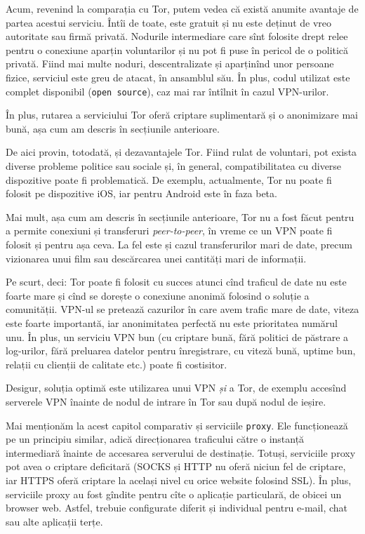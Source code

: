 Acum, revenind la comparația cu Tor, putem vedea că există anumite avantaje
de partea acestui serviciu. Întîi de toate, este gratuit și nu este deținut
de vreo autoritate sau firmă privată. Nodurile intermediare care sînt folosite
drept relee pentru o conexiune aparțin voluntarilor și nu pot fi puse în pericol
de o politică privată. Fiind mai multe noduri, descentralizate și aparținînd unor
persoane fizice, serviciul este greu de atacat, în ansamblul său.
În plus, codul utilizat este complet disponibil
(\texttt{open source}), caz mai rar întîlnit în cazul VPN-urilor.

În plus, rutarea  a serviciului Tor oferă criptare suplimentară
și o anonimizare mai bună, așa cum am descris în secțiunile anterioare.

De aici provin, totodată, și dezavantajele Tor. Fiind rulat de voluntari, pot exista
diverse probleme politice sau sociale și, în general, compatibilitatea cu diverse
dispozitive poate fi problematică. De exemplu, actualmente, Tor nu poate fi folosit
pe dispozitive iOS, iar pentru Android este în faza beta.

Mai mult, așa cum am descris în secțiunile anterioare, Tor nu a fost făcut pentru
a permite conexiuni și transferuri \textit{peer-to-peer}, în vreme ce un VPN poate
fi folosit și pentru așa ceva. La fel este și cazul transferurilor mari de date,
precum vizionarea unui film sau descărcarea unei cantități mari de informații.

\vspace{1cm}

Pe scurt, deci: Tor poate fi folosit cu succes atunci cînd traficul de date nu
este foarte mare și cînd se dorește o conexiune anonimă folosind o soluție a
comunității. VPN-ul se pretează cazurilor în care avem trafic mare de date,
viteza este foarte importantă, iar anonimitatea perfectă nu este prioritatea
numărul unu. În plus, un serviciu VPN bun (cu criptare bună, fără politici de
păstrare a log-urilor, fără preluarea datelor pentru înregistrare, cu viteză bună,
uptime bun, relații cu clienții de calitate etc.) poate fi costisitor.

Desigur, soluția optimă este utilizarea unui VPN \textit{și} a Tor, de exemplu
accesînd serverele VPN înainte de nodul de intrare în Tor sau după nodul de
ieșire.

Mai menționăm la acest capitol comparativ și serviciile \texttt{proxy}.
Ele funcționează pe un principiu similar, adică direcționarea traficului către
o instanță intermediară înainte de accesarea serverului de destinație. Totuși,
serviciile proxy pot avea o criptare deficitară (SOCKS și HTTP nu oferă niciun
fel de criptare, iar HTTPS oferă criptare la același nivel cu orice website
folosind SSL). În plus, serviciile proxy au fost gîndite pentru cîte o aplicație
particulară, de obicei un browser web. Astfel, trebuie configurate diferit și
individual pentru e-mail, chat sau alte aplicații terțe.

